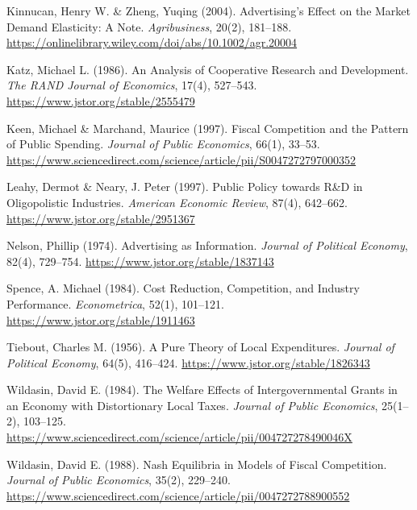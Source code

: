 \documentclass[sn-mathphys-ay]{sn-jnl} %
\theoremstyle{remark}
\begin{document}
\begin{thebibliography}{}
Kinnucan, Henry W. \& Zheng, Yuqing (2004).
\newblock Advertising's Effect on the Market Demand Elasticity: A Note.
\newblock \emph{Agribusiness}, 20(2), 181--188.
\newblock \url{https://onlinelibrary.wiley.com/doi/abs/10.1002/agr.20004}

Katz, Michael L. (1986).
\newblock An Analysis of Cooperative Research and Development.
\newblock \emph{The RAND Journal of Economics}, 17(4), 527--543.
\newblock \url{https://www.jstor.org/stable/2555479}

Keen, Michael \& Marchand, Maurice (1997).
\newblock Fiscal Competition and the Pattern of Public Spending.
\newblock \emph{Journal of Public Economics}, 66(1), 33--53.
\newblock \url{https://www.sciencedirect.com/science/article/pii/S0047272797000352}

Leahy, Dermot \& Neary, J. Peter (1997).
\newblock Public Policy towards R\&D in Oligopolistic Industries.
\newblock \emph{American Economic Review}, 87(4), 642--662.
\newblock \url{https://www.jstor.org/stable/2951367}

Nelson, Phillip (1974).
\newblock Advertising as Information.
\newblock \emph{Journal of Political Economy}, 82(4), 729--754.
\newblock \url{https://www.jstor.org/stable/1837143}

Spence, A. Michael (1984).
\newblock Cost Reduction, Competition, and Industry Performance.
\newblock \emph{Econometrica}, 52(1), 101--121.
\newblock \url{https://www.jstor.org/stable/1911463}

Tiebout, Charles M. (1956).
\newblock A Pure Theory of Local Expenditures.
\newblock \emph{Journal of Political Economy}, 64(5), 416--424.
\newblock \url{https://www.jstor.org/stable/1826343}

Wildasin, David E. (1984).
\newblock The Welfare Effects of Intergovernmental Grants in an Economy with Distortionary Local Taxes.
\newblock \emph{Journal of Public Economics}, 25(1--2), 103--125.
\newblock \url{https://www.sciencedirect.com/science/article/pii/004727278490046X}

Wildasin, David E. (1988).
\newblock Nash Equilibria in Models of Fiscal Competition.
\newblock \emph{Journal of Public Economics}, 35(2), 229--240.
\newblock \url{https://www.sciencedirect.com/science/article/pii/0047272788900552}


\end{thebibliography}
\end{document}
